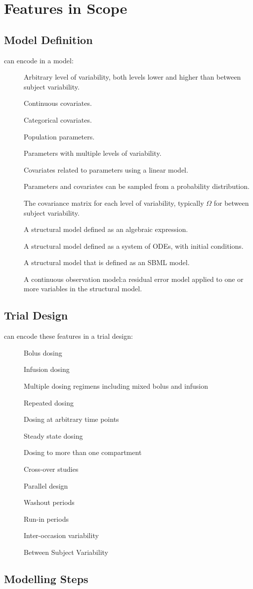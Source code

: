 \newenvironment{features}{\begin{description}}{\end{description}}
\newcommand\feat{\item[]}

\clearpage

\section{Features in Scope}

\subsection{Model Definition}

\pharmml can encode in a model:
\begin{features}
\feat Arbitrary level of variability, both levels lower and higher than between subject variability.
\feat Continuous covariates.
\feat Categorical covariates.
\feat Population parameters.
\feat Parameters with multiple levels of variability.
\feat Covariates related to parameters using a linear model.
\feat Parameters and covariates can be sampled from a probability distribution.
\feat The covariance matrix for each level of variability, typically $\Omega$ for between subject variability.
\feat A structural model defined as an algebraic expression.
\feat A structural model defined as a system of ODEs, with initial conditions.
\feat A structural model that is defined as an SBML model.
\feat A continuous observation model:a residual error model applied to one or more variables in the structural model.
\end{features}


\subsection{Trial Design}

\pharmml can encode these features in a trial design:
\begin{features}
\feat Bolus dosing
\feat Infusion dosing
\feat Multiple dosing regimens including mixed bolus and infusion
\feat Repeated dosing
\feat Dosing at arbitrary time points
\feat Steady state dosing
\feat Dosing to more than one compartment
\feat Cross-over studies
\feat Parallel design
\feat Washout periods
\feat Run-in periods
\feat Inter-occasion variability
\feat Between Subject Variability
\end{features}

\subsection{Modelling Steps}

